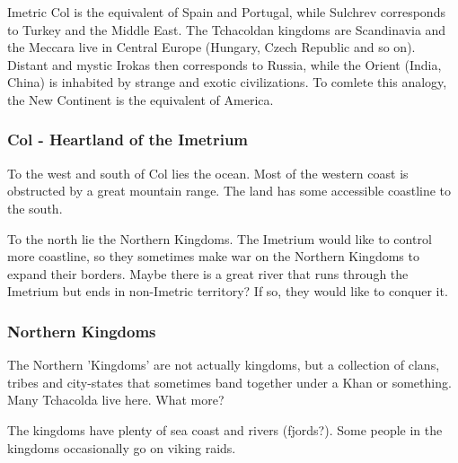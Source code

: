 Imetric Col is the equivalent of Spain and Portugal, while Sulchrev corresponds to Turkey and the Middle East. The Tchacoldan kingdoms are Scandinavia and the Meccara live in Central Europe (Hungary, Czech Republic and so on). Distant and mystic Irokas then corresponds to Russia, while the Orient (India, China) is inhabited by strange and exotic civilizations. To comlete this analogy, the New Continent is the equivalent of America.

\subsubsection{Col - Heartland of the Imetrium}
To the west and south of Col lies the ocean. Most of the western coast is obstructed by a great mountain range. The land has some accessible coastline to the south. 

To the north lie the Northern Kingdoms. The Imetrium would like to control more coastline, so they sometimes make war on the Northern Kingdoms to expand their borders. Maybe there is a great river that runs through the Imetrium but ends in non-Imetric territory? If so, they would like to conquer it. 

\subsubsection{Northern Kingdoms}
The Northern 'Kingdoms' are not actually kingdoms, but a collection of clans, tribes and city-states that sometimes band together under a Khan or something. Many Tchacolda live here. What more?

The kingdoms have plenty of sea coast and rivers (fjords?). Some people in the kingdoms occasionally go on viking raids. 




